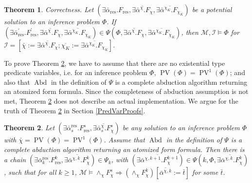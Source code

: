 \documentclass{article}
\newcommand{\assign}{:=}
\newcommand{\tmem}[1]{{\em #1\/}}
\newcommand{\tmop}[1]{\ensuremath{\operatorname{#1}}}
\newtheorem{theorem}{Theorem}
\begin{document}
\begin{theorem}
  \label{ThCorrect}{\tmem{Correctness}}. Let $\left( \exists
  \bar{\alpha}_{\tmop{res}} .F_{\tmop{res}}, \overline{\exists
  \bar{\alpha}^{\chi} .F_{\chi}}, \overline{\exists \bar{\alpha}^{\chi_K}
  .F_{\chi_K}} \right)$ be a potential solution to an inference problem
  $\Phi$. If $\left( \exists \bar{\alpha}_{\tmop{res}}^{\prime}
  .F_{\tmop{res}}^{\prime}, \overline{\exists \bar{\alpha}^{\chi} .F_{\chi}},
  \overline{\exists \bar{\alpha}^{\chi_K} .F_{\chi_K}} \right) \in \Psi (\Phi,
  \overline{\exists \bar{\alpha}^{\chi} .F_{\chi}}, \overline{\exists
  \bar{\alpha}^{\chi_K} .F_{\chi_K}})$, then $\mathcal{M}, \mathcal{I} \vDash
  \Phi$ for $\mathcal{I}= \left[ \bar{\chi} \assign \overline{\exists
  \bar{\alpha}^{\chi} .F_{\chi}} ; \overline{\chi_K} \assign \overline{\exists
  \bar{\alpha}^{\chi_K} .F_{\chi_K}} \right]$.
\end{theorem}

To prove Theorem \ref{InferCompleteness}, we have to assume that there are no
existential type predicate variables, i.e. for an inference problem $\Phi$,
$\tmop{PV} (\Phi) = \tmop{PV}^1 (\Phi)$; and also that $\tmop{Abd}$ in the
definition of $\Psi$ is a complete abduction algorithm returning an atomized
form formula. Since the completeness of abduction assumption is not met,
Theorem \ref{InferCompleteness} does not describe an actual implementation. We
argue for the truth of Theorem \ref{InferCompleteness} in Section
\ref{PredVarProofs}.

\begin{theorem}
  \label{InferCompleteness}Let $(\exists \bar{\alpha}^{\tmop{res}}_s
  .F_{\tmop{res}}^s, \overline{\exists \bar{\alpha}^{\chi}_s .F_{\chi}^s})$ be
  any solution to an inference problem $\Phi$ with $\bar{\chi} = \tmop{PV}
  (\Phi) = \tmop{PV}^1 (\Phi)$. Assume that $\tmop{Abd}$ in the definition of
  $\Psi$ is a complete abduction algorithm returning an atomized form formula.
  Then there is a chain $(\exists \bar{\alpha}^{\tmop{res}}_k
  .F_{\tmop{res}}^k, \overline{\exists \bar{\alpha}^{\chi, k} .F_{\chi}^k})
  \in \Psi_k$, with $(\overline{\exists \bar{\alpha}^{\chi, k + 1}
  .F_{\chi}^{k + 1}}) \in \Psi (k, \Phi, \overline{\exists \bar{\alpha}^{\chi,
  k} .F_{\chi}^k})$, such that for all $k \geqslant 1$, $\mathcal{M} \vDash
  \wedge_{\chi} F^s_{\chi} \Rightarrow (\wedge_{\chi} F^k_{\chi})
  [\overline{\bar{\alpha}^{\chi, k}} \assign \bar{t}]$ for some $\bar{t}$.
\end{theorem}
\end{document}
